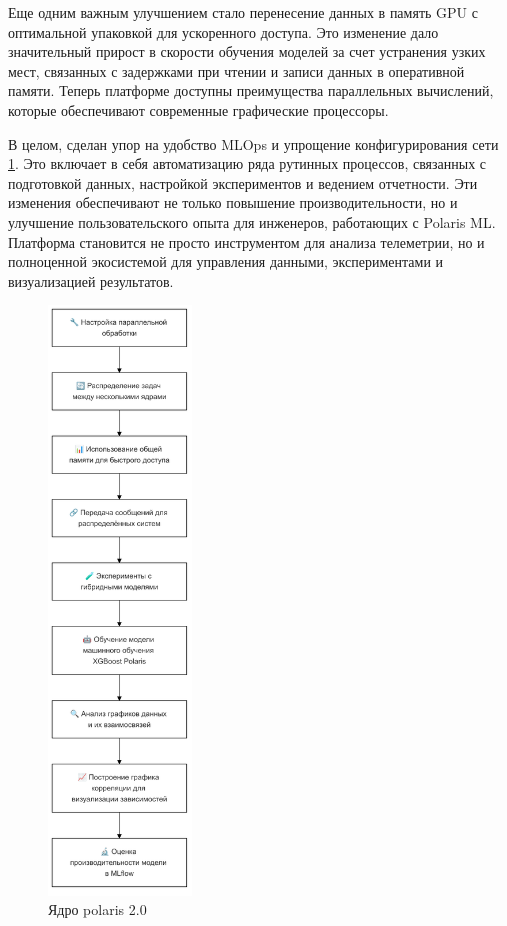 \documentclass[14pt, a4paper]{bsu}
\begin{document}
Еще одним важным улучшением стало перенесение данных в память GPU с оптимальной
упаковкой для ускоренного доступа. Это изменение дало значительный прирост в
скорости обучения моделей за счет устранения узких мест, связанных с задержками
при чтении и записи данных в оперативной памяти. Теперь платформе доступны
преимущества параллельных вычислений, которые обеспечивают современные
графические процессоры.

В целом, сделан упор на удобство MLOps и упрощение конфигурирования сети
\ref{fig:polaris_core}. Это включает в себя автоматизацию ряда рутинных
процессов, связанных с подготовкой данных, настройкой экспериментов и ведением
отчетности. Эти изменения обеспечивают не только повышение производительности,
но и улучшение пользовательского опыта для инженеров, работающих с Polaris ML.
Платформа становится не просто инструментом для анализа телеметрии, но и
полноценной экосистемой для управления данными, экспериментами и визуализацией
результатов.

\begin{figure}[htbp] \centering
	\includegraphics[width=0.34\textwidth]{polaris_core} \caption{Ядро polaris 2.0}
	\label{fig:polaris_core} \end{figure}
\end{document}

